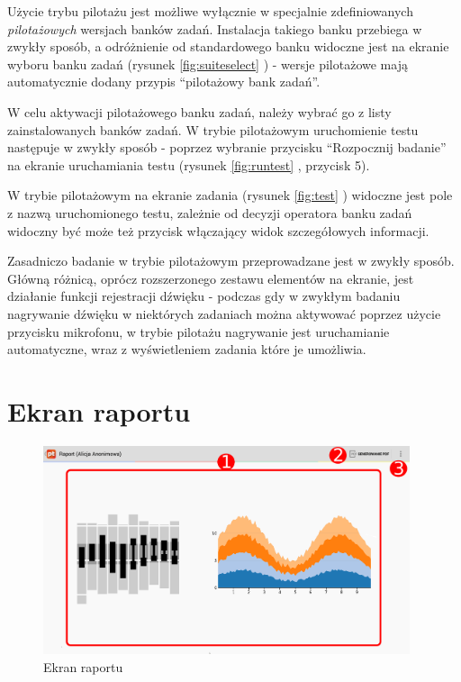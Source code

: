 \documentclass[a4paper,10pt,twosided]{book}
\newcommand{\refwithpage}[3]{
\ref{#1}\ifthenelse{\equal{\thepage}{\pageref{#1}}}{}{#2\pageref{#1}#3}%
}
\newcommand{\ppref}[1]{\refwithpage{#1}{ -- strona }{}}
\begin{document}
Użycie trybu pilotażu jest możliwe wyłącznie w specjalnie zdefiniowanych \emph{pilotażowych} wersjach banków zadań. Instalacja takiego banku przebiega w zwykły sposób, a odróżnienie od standardowego banku widoczne jest na ekranie wyboru banku zadań (rysunek \ppref{fig:suiteselect}) - wersje pilotażowe mają automatycznie dodany przypis ``pilotażowy bank zadań''.

W celu aktywacji pilotażowego banku zadań, należy wybrać go z listy zainstalowanych banków zadań. W trybie pilotażowym uruchomienie testu następuje w zwykły sposób - poprzez wybranie przycisku ``Rozpocznij badanie'' na ekranie uruchamiania testu (rysunek \ppref{fig:runtest}, przycisk 5).

W trybie pilotażowym na ekranie zadania (rysunek \ppref{fig:test}) widoczne jest pole z nazwą uruchomionego testu, zależnie od decyzji operatora banku zadań widoczny być może też przycisk włączający widok szczegółowych informacji.

Zasadniczo badanie w trybie pilotażowym przeprowadzane jest w zwykły sposób. Główną różnicą, oprócz rozszerzonego zestawu elementów na ekranie, jest działanie funkcji rejestracji dźwięku - podczas gdy w zwykłym badaniu nagrywanie dźwięku w niektórych zadaniach można aktywować poprzez użycie przycisku mikrofonu, w trybie pilotażu nagrywanie jest uruchamianie automatyczne, wraz z wyświetleniem zadania które je umożliwia.


\chapter{Ekran raportu}
\label{chap:report}

\begin{figure}[b!]
\includegraphics[width=0.96\textwidth]{report.pdf}
\caption{Ekran raportu}
\label{fig:report}
\end{figure}
\end{document}
